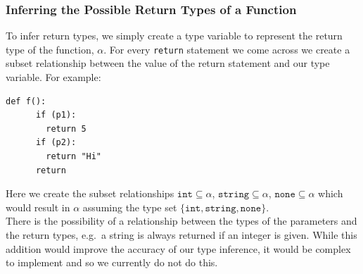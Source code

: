 \documentclass[12pt, titlepage]{article}
\begin{document}
\subsubsection{Inferring the Possible Return Types of a Function}
To infer return types, we simply create a type variable to represent the return type of the function, $\alpha$. For every \texttt{return} statement we come across we create a subset relationship between the value of the return statement and our type variable. For example:
\begin{lstlisting}[mathescape]
    def f():
      if (p1):
        return 5
      if (p2):
        return "Hi"
      return
\end{lstlisting}
Here we create the subset relationships $\texttt{int} \subseteq \alpha$, $\texttt{string} \subseteq \alpha$, $\texttt{none} \subseteq \alpha$ which would result in $\alpha$ assuming the type set $\{\texttt{int}, \texttt{string}, \texttt{none}\}$. \\
\indent There is the possibility of a relationship between the types of the parameters and the return types, e.g.\ a string is always returned if an integer is given. While this addition would improve the accuracy of our type inference, it would be complex to implement and so we currently do not do this.
\end{document}
